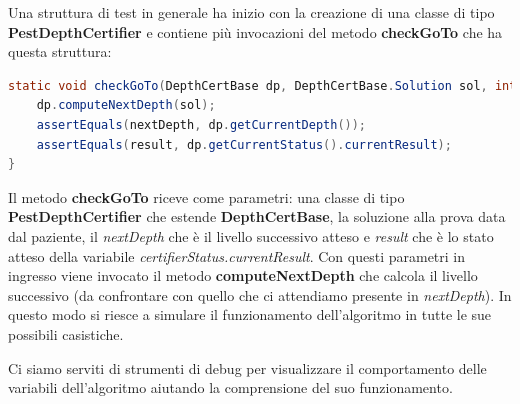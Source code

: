\documentclass[
	corpo=12pt,
	twoside,
 	evenboxes,
	tipotesi=triennale,
    	stile=classica,
   	 greek,
]{toptesi}
\begin{document}
Una struttura di test in generale ha inizio con la creazione di una classe di tipo \textbf{PestDepthCertifier} e contiene più invocazioni del metodo \textbf{checkGoTo} che ha questa struttura:

\begin{lstlisting}[language=Java, label=lst:checkgoto, caption={Metodo checkGoTo}]
static void checkGoTo(DepthCertBase dp, DepthCertBase.Solution sol, int nextDepth, Result result) {
	dp.computeNextDepth(sol);
	assertEquals(nextDepth, dp.getCurrentDepth());
	assertEquals(result, dp.getCurrentStatus().currentResult);
}
\end{lstlisting}

Il metodo \textbf{checkGoTo} riceve come parametri: una classe di tipo \textbf{PestDepthCertifier} che estende \textbf{DepthCertBase}, la soluzione alla prova data dal paziente, il \textit{nextDepth} che è il livello successivo atteso e \textit{result} che è lo stato atteso della variabile \textit{certifierStatus.currentResult}. Con questi parametri in ingresso viene invocato il metodo \textbf{computeNextDepth} che calcola il livello successivo (da confrontare con quello che ci attendiamo presente in \textit{nextDepth}). In questo modo si riesce a simulare il funzionamento dell'algoritmo in tutte le sue possibili casistiche.

Ci siamo serviti di strumenti di debug per visualizzare il comportamento delle variabili dell'algoritmo aiutando la comprensione del suo funzionamento.

\newpage
\end{document}
